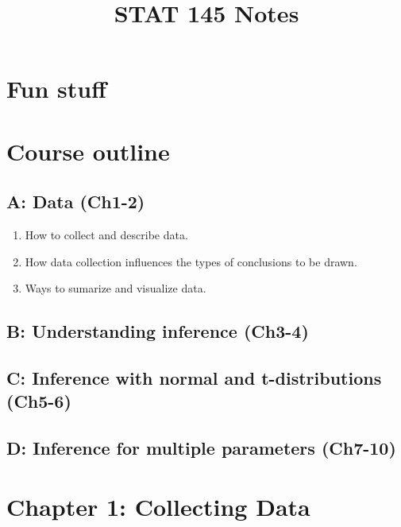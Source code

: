 \documentclass{article}
\title{STAT 145 Notes}
\date
\begin{document}
\maketitle
\large

\tableofcontents


\section{Fun stuff}


\section{Course outline}

\subsection{A: Data (Ch1-2)}
\begin{enumerate}
\item How to collect and describe data.
\item How data collection influences the types of conclusions to be drawn.
\item Ways to sumarize and visualize data.
\end{enumerate}

\subsection{B: Understanding inference (Ch3-4)}

\subsection{C: Inference with normal and t-distributions (Ch5-6)}

\subsection{D: Inference for multiple parameters (Ch7-10)}


\section{Chapter 1: Collecting Data}
\end{document}
